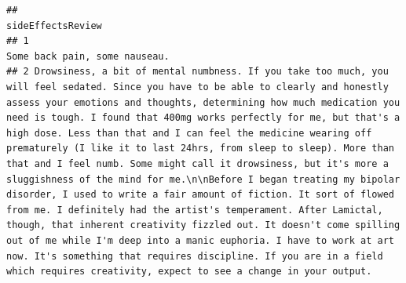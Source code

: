 \documentclass[spanish,]{article}
\begin{document}
\begin{verbatim}
##                                                                                                                                                                                                                                                                                                                                                                                                                                                                                                                                                                                                                                                                                                                                                                                                                                                                                                                                                                                     sideEffectsReview
## 1                                                                                                                                                                                                                                                                                                                                                                                                                                                                                                                                                                                                                                                                                                                                                                                                                                                                                                                                                                       Some back pain, some nauseau.
## 2 Drowsiness, a bit of mental numbness. If you take too much, you will feel sedated. Since you have to be able to clearly and honestly assess your emotions and thoughts, determining how much medication you need is tough. I found that 400mg works perfectly for me, but that's a high dose. Less than that and I can feel the medicine wearing off prematurely (I like it to last 24hrs, from sleep to sleep). More than that and I feel numb. Some might call it drowsiness, but it's more a sluggishness of the mind for me.\n\nBefore I began treating my bipolar disorder, I used to write a fair amount of fiction. It sort of flowed from me. I definitely had the artist's temperament. After Lamictal, though, that inherent creativity fizzled out. It doesn't come spilling out of me while I'm deep into a manic euphoria. I have to work at art now. It's something that requires discipline. If you are in a field which requires creativity, expect to see a change in your output.

\end{verbatim}
\end{document}

